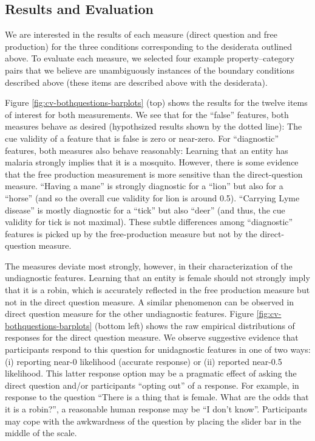 \documentclass[english,floatsintext,man]{apa6}
\theoremstyle{definition}
\theoremstyle{definition}
\theoremstyle{definition}
\theoremstyle{remark}
\begin{document}
\subsection{Results and Evaluation}\label{results-and-evaluation}

We are interested in the results of each measure (direct question and
free production) for the three conditions corresponding to the
desiderata outlined above. To evaluate each measure, we selected four
example property--category pairs that we believe are unambiguously
instances of the boundary conditions described above (these items are
described above with the desiderata).

Figure \ref{fig:cv-bothquestions-barplots} (top) shows the results for
the twelve items of interest for both measurements. We see that for the
\enquote{false} features, both measures behave as desired (hypothsized
results shown by the dotted line): The cue validity of a feature that is
false is zero or near-zero. For \enquote{diagnostic} features, both
measures also behave reasonably: Learning that an entity has malaria
strongly implies that it is a mosquito. However, there is some evidence
that the free production measurement is more sensitive than the
direct-question measure. \enquote{Having a mane} is strongly diagnostic
for a \enquote{lion} but also for a \enquote{horse} (and so the overall
cue validity for lion is around 0.5). \enquote{Carrying Lyme disease} is
mostly diagnostic for a \enquote{tick} but also \enquote{deer} (and
thus, the cue validity for tick is not maximal). These subtle
differences among \enquote{diagnostic} features is picked up by the
free-production measure but not by the direct-question measure.

The measures deviate most strongly, however, in their characterization
of the undiagnostic features. Learning that an entity is female should
not strongly imply that it is a robin, which is accurately reflected in
the free production measure but not in the direct question measure. A
similar phenomenon can be observed in direct question measure for the
other undiagnostic features. Figure \ref{fig:cv-bothquestions-barplots}
(bottom left) shows the raw empirical distributions of responses for the
direct question measure. We observe suggestive evidence that
participants respond to this question for unidagnostic features in one
of two ways: (i) reporting near-0 likelihood (accurate response) or (ii)
reported near-0.5 likelihood. This latter response option may be a
pragmatic effect of asking the direct question and/or participants
\enquote{opting out} of a response. For example, in response to the
question \enquote{There is a thing that is female. What are the odds
that it is a robin?}, a reasonable human response may be \enquote{I
don't know}. Participants may cope with the awkwardness of the question
by placing the slider bar in the middle of the scale.
\end{document}
